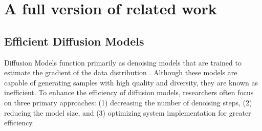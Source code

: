 



    


\section{A full version of related work}


\subsection{Efficient Diffusion Models}\label{subsec:efficient_diffusion}
Diffusion Models function primarily as denoising models that are trained to estimate the gradient of the data distribution \citep{song2019generative}. Although these models are capable of generating samples with high quality and diversity, they are known as inefficient. To enhance the efficiency of diffusion models, researchers often focus on three primary approaches: (1) decreasing the number of denoising steps, (2) reducing the model size, and (3) optimizing system implementation for greater efficiency.


